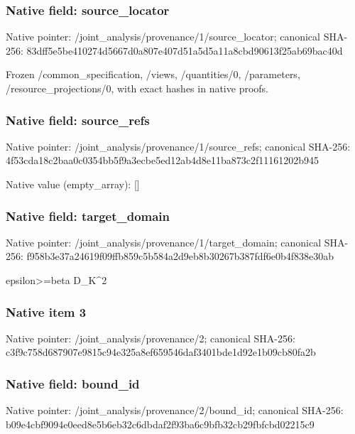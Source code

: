 \documentclass[10pt,a4paper]{article}
\begin{document}
\subsubsection{Native field: source\_\allowbreak{}locator}
Native pointer: /joint\_\allowbreak{}analysis/provenance/1/source\_\allowbreak{}locator; canonical SHA-256: 83dff5e5be410274d5667d0a807e407d51a5d5a11a8cbd90613f25ab69bac40d

\begingroup\raggedright\sloppy Frozen /\allowbreak{}common\_\allowbreak{}specification,\allowbreak{} /\allowbreak{}views,\allowbreak{} /\allowbreak{}quantities/\allowbreak{}0,\allowbreak{} /\allowbreak{}parameters,\allowbreak{} /\allowbreak{}resource\_\allowbreak{}projections/\allowbreak{}0,\allowbreak{} with exact hashes in native proofs.\par\endgroup

\subsubsection{Native field: source\_\allowbreak{}refs}
Native pointer: /joint\_\allowbreak{}analysis/provenance/1/source\_\allowbreak{}refs; canonical SHA-256: 4f53cda18c2baa0c0354bb5f9a3ecbe5ed12ab4d8e11ba873c2f11161202b945

Native value (empty\_\allowbreak{}array): []

\subsubsection{Native field: target\_\allowbreak{}domain}
Native pointer: /joint\_\allowbreak{}analysis/provenance/1/target\_\allowbreak{}domain; canonical SHA-256: f958b3e37a24619f09ffb859c5b584a2d9eb8b30267b387fdf6e0b4f838e30ab

\begingroup\raggedright\sloppy epsilon>=\allowbreak{}beta D\_\allowbreak{}K\textasciicircum{}2\par\endgroup

\subsubsection{Native item 3}
Native pointer: /joint\_\allowbreak{}analysis/provenance/2; canonical SHA-256: c3f9c758d687907e9815c94e325a8ef659546daf3401bde1d92e1b09cb80fa2b

\subsubsection{Native field: bound\_\allowbreak{}id}
Native pointer: /joint\_\allowbreak{}analysis/provenance/2/bound\_\allowbreak{}id; canonical SHA-256: b09e4cbf9094e0eed8e5b6eb32c6dbdaf2f93ba6c9bfb32cb29fbfcbd02215c9
\end{document}
